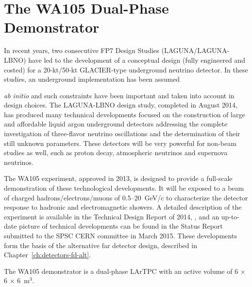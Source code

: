 \section{The WA105 Dual-Phase Demonstrator}
\label{sec:proto-cern-double}

In recent years, two consecutive FP7 Design Studies
(LAGUNA/LAGUNA-LBNO) have led to the development of a conceptual
design (fully engineered and costed) for a 20-kt/50-kt GLACIER-type
underground neutrino detector. In these studies, an underground
implementation has been assumed {\textit{ab initio} 
and such constraints have been important and taken into account in
design choices. The LAGUNA-LBNO design study, completed in August
2014, has produced many technnical developments focused on the
construction of large and affordable liquid argon underground
detectors addressing the complete investigation of three-flavor
neutrino oscillations and the determination of their still unknown
parameters.
%
These detectors will be very powerful for non-beam studies as well,
such as proton decay, atmospheric neutrinos and supernova neutrinos.

The WA105 experiment, approved in 2013, is designed to provide a full-scale demonstration
of these technological developments. It will be exposed to a beam of
charged hadrons/electrons/muons of 0.5--20~GeV/c to characterize the
detector response to hadronic and electromagnetic showers.  A detailed
description of the experiment is available in the Technical Design
Report of 2014, \anxdualtdr, %
and an up-to-date picture of
technical developments can be found in the Status Report\cite{WA105_SREP}
submitted to the SPSC CERN committee in March
2015. These developments form the basis of the
alternative far detector design, described in
Chapter~\ref{ch:detectors-fd-alt}.


The WA105 demonstrator is a dual-phase LArTPC with an active volume of
6 $\times$ 6 $\times$ 6~m$^3$.

}

